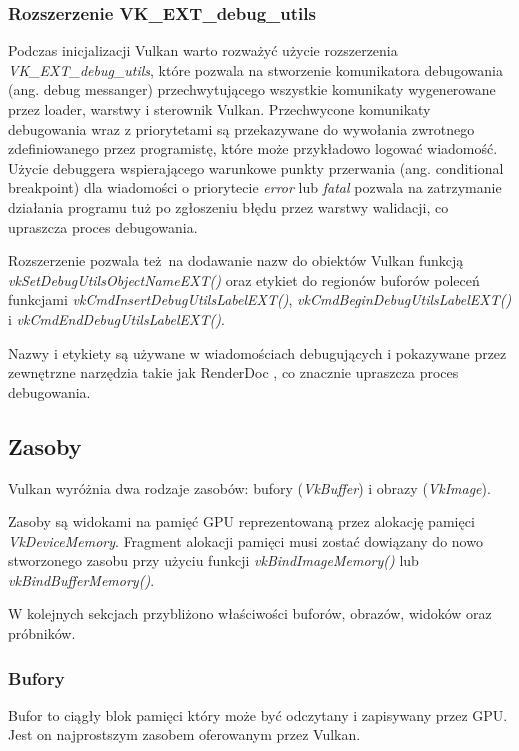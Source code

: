 \subsubsection{Rozszerzenie VK\_EXT\_debug\_utils}

Podczas inicjalizacji Vulkan warto rozważyć użycie rozszerzenia \textit{VK\_EXT\_debug\_utils}, które pozwala na stworzenie komunikatora debugowania (ang. debug messanger) przechwytującego wszystkie komunikaty wygenerowane przez loader, warstwy i sterownik Vulkan.
Przechwycone komunikaty debugowania wraz z priorytetami są przekazywane do wywołania zwrotnego zdefiniowanego przez programistę, które może przykładowo logować wiadomość.
Użycie debuggera wspierającego warunkowe punkty przerwania (ang. conditional breakpoint) dla wiadomości o priorytecie \textit{error} lub \textit{fatal} pozwala na zatrzymanie działania programu tuż po zgłoszeniu błędu przez warstwy walidacji, co upraszcza proces debugowania.

Rozszerzenie pozwala też na dodawanie nazw do obiektów Vulkan funkcją \textit{vkSetDebugUtilsObjectNameEXT()} oraz etykiet do regionów buforów poleceń funkcjami \textit{vkCmdInsertDebugUtilsLabelEXT()}, \textit{vkCmdBeginDebugUtilsLabelEXT()} i \textit{vkCmdEndDebugUtilsLabelEXT()}.

Nazwy i etykiety są używane w wiadomościach debugujących i pokazywane przez zewnętrzne narzędzia takie jak RenderDoc \cite{RENDERDOC}, co znacznie upraszcza proces debugowania.


\subsection{Zasoby}

Vulkan wyróżnia dwa rodzaje zasobów: bufory (\textit{VkBuffer}) i obrazy (\textit{VkImage}).

Zasoby są widokami na pamięć GPU reprezentowaną przez alokację pamięci \textit{VkDeviceMemory}.
Fragment alokacji pamięci musi zostać dowiązany do nowo stworzonego zasobu przy użyciu funkcji \textit{vkBindImageMemory()} lub \textit{vkBindBufferMemory()}.

W kolejnych sekcjach przybliżono właściwości buforów, obrazów, widoków oraz próbników. 

\subsubsection{Bufory}

Bufor to ciągły blok pamięci który może być odczytany i zapisywany przez GPU. Jest on najprostszym zasobem oferowanym przez Vulkan.

